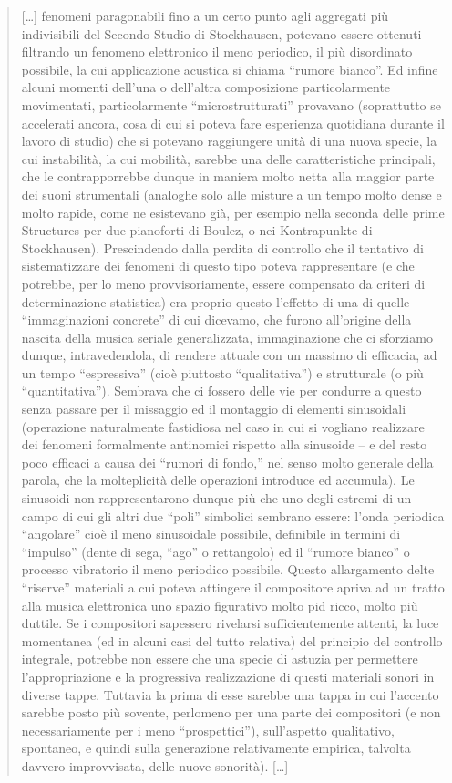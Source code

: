 \begin{quote}
	[\ldots] fenomeni paragonabili fino a un certo punto agli aggregati più indivisibili del Secondo Studio di Stockhausen, potevano essere ottenuti filtrando un fenomeno elettronico il meno periodico, il più disordinato possibile, la cui applicazione acustica si chiama “rumore bianco”. Ed infine alcuni momenti dell’una o dell’altra composizione particolarmente movimentati, particolarmente “microstrutturati” provavano (soprattutto se accelerati ancora, cosa di cui si poteva fare esperienza quotidiana durante il lavoro di studio) che si potevano raggiungere unità di una nuova specie, la cui instabilità, la cui mobilità, sarebbe una delle caratteristiche principali, che le contrapporrebbe dunque in maniera molto netta alla maggior parte dei suoni strumentali (analoghe solo alle misture a un tempo molto dense e molto rapide, come ne esistevano già, per esempio nella seconda delle prime Structures per due pianoforti di Boulez, o nei Kontrapunkte di Stockhausen). Prescindendo dalla perdita di controllo che il tentativo di sistematizzare dei fenomeni di questo tipo poteva rappresentare (e che potrebbe, per lo meno provvisoriamente, essere compensato da criteri di determinazione statistica) era proprio questo l’effetto di una di quelle “immaginazioni concrete” di cui dicevamo, che furono all’origine della nascita della musica seriale generalizzata, immaginazione che ci sforziamo dunque, intravedendola, di rendere attuale con un massimo di efficacia, ad un tempo “espressiva” (cioè piuttosto “qualitativa”) e strutturale (o più “quantitativa”). Sembrava che ci fossero delle vie per condurre a questo senza passare per il missaggio ed il montaggio di elementi sinusoidali (operazione naturalmente fastidiosa nel caso in cui si vogliano realizzare dei fenomeni formalmente antinomici rispetto alla sinusoide – e del resto poco efficaci a causa dei “rumori di fondo,” nel senso molto generale della parola, che la molteplicità delle operazioni introduce ed accumula). Le sinusoidi non rappresentarono dunque più che uno degli estremi di un campo di cui gli altri due “poli” simbolici sembrano essere: l’onda periodica “angolare” cioè il meno sinusoidale possibile, definibile in termini di “impulso” (dente di sega, “ago” o rettangolo) ed il “rumore bianco” o processo vibratorio il meno periodico possibile. Questo allargamento delte “riserve” materiali a cui poteva attingere il compositore apriva ad un tratto alla musica elettronica uno spazio figurativo molto pid ricco, molto più duttile. Se i compositori sapessero rivelarsi sufficientemente attenti, la luce momentanea (ed in alcuni casi del tutto relativa) del principio del controllo integrale, potrebbe non essere che una specie di astuzia per permettere l’appropriazione e la progressiva realizzazione di questi materiali sonori in diverse tappe. Tuttavia la prima di esse sarebbe una tappa in cui l’accento sarebbe posto più sovente, perlomeno per una parte dei compositori (e non necessariamente per i meno “prospettici”), sull’aspetto qualitativo, spontaneo, e quindi sulla generazione relativamente empirica, talvolta davvero improvvisata, delle nuove sonorità).
	[\ldots]
\end{quote}

